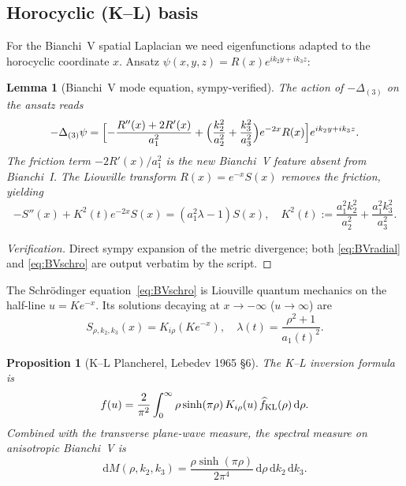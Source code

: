 \documentclass[11pt,a4paper]{article}
\newtheorem{proposition}[theorem]{Proposition}
\newtheorem{lemma}[theorem]{Lemma}
\theoremstyle{definition}
\newcommand{\dd}{\mathrm{d}}
\begin{document}
\subsection{Horocyclic (K--L) basis}
For the Bianchi~V spatial Laplacian we need eigenfunctions adapted to the
horocyclic coordinate $x$.  Ansatz
$\psi(x,y,z) = R(x) e^{i k_2 y + i k_3 z}$:

\begin{lemma}[Bianchi~V mode equation, sympy-verified]
\label{lem:BVmode}
The action of $-\Delta_{(3)}$ on the ansatz reads
\begin{equation}
-\Delta_{(3)} \psi = \Bigl[ -\frac{R''(x) + 2 R'(x)}{a_1^2}
+ \Bigl(\frac{k_2^2}{a_2^2} + \frac{k_3^2}{a_3^2}\Bigr) e^{-2x} R(x) \Bigr] e^{i k_2 y + i k_3 z}.
\label{eq:BVradial}
\end{equation}
The friction term $-2 R'(x)/a_1^2$ is the new Bianchi~V feature absent
from Bianchi~I. The Liouville transform $R(x) = e^{-x} S(x)$ removes the
friction, yielding
\begin{equation}
-S''(x) + K^2(t) e^{-2x} S(x) = (a_1^2 \lambda - 1) S(x),
\quad K^2(t) := \frac{a_1^2 k_2^2}{a_2^2} + \frac{a_1^2 k_3^2}{a_3^2}.
\label{eq:BVschro}
\end{equation}
\end{lemma}

\begin{proof}[Verification]
Direct sympy expansion of the metric divergence; both \eqref{eq:BVradial}
and \eqref{eq:BVschro} are output verbatim by the script.
\end{proof}

The Schr\"odinger equation~\eqref{eq:BVschro} is Liouville quantum
mechanics on the half-line $u = K e^{-x}$. Its solutions decaying at
$x \to -\infty$ ($u \to \infty$) are
\begin{equation}
S_{\rho,k_2,k_3}(x) = K_{i\rho}(K e^{-x}),
\quad \lambda(t) = \frac{\rho^2 + 1}{a_1(t)^2}.
\label{eq:Kirho}
\end{equation}

\begin{proposition}[K--L Plancherel, Lebedev 1965 \S6]
The K--L inversion formula is
\begin{equation}
f(u) = \frac{2}{\pi^2} \int_0^\infty \rho \sinh(\pi \rho)\, K_{i\rho}(u)\,
\widehat{f}_{\rm KL}(\rho)\, \dd \rho.
\end{equation}
Combined with the transverse plane-wave measure, the spectral measure on
anisotropic Bianchi~V is
\begin{equation}
\dd M(\rho, k_2, k_3) = \frac{\rho \sinh(\pi \rho)}{2\pi^4}\, \dd \rho\, \dd k_2\, \dd k_3.
\end{equation}
\end{proposition}
\end{document}
